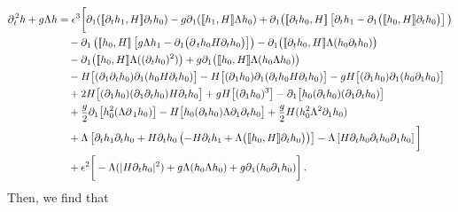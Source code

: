 \documentclass[11pt]{article}
\theoremstyle{plain}
\theoremstyle{definition}
\theoremstyle{definition}
\def\p{\text{\bf\emph{p}}}
\def\p{{\partial\hspace{1pt}}}
\def\comm#1#2{{\llbracket#1,#2\rrbracket}}
\def\smallexp#1{{\text{\small #1}}}
\def\dfrac#1#2{\smallexp{$\displaystyle{}\frac{#1}{#2}$}}
\begin{document}
\begin{align*}
\p_{\!t}^2 h + g\Lambda h &= \epsilon^3\bigg{[}\p_{\!1} (\comm{\p_{\!t} h_1}{H} \partial_t h_0) - g\p_{\!1} (\comm{h_1}{H} \Lambda h_0) + \p_{\!1} \big(\comm{\p_{\!t} h_0}{H} \left[\partial_t h_1-\p_{\!1} \big(\comm{h_0}{H} \partial_t h_0\big)\right]\big) \\
&\quad -\p_{\!1} \left(\comm{h_0}{H} \left[g \Lambda h_1 - \partial_1 \big(\p_t h_0H\partial_t h_0 \big)\right]\right) - \p_{\!1} \big(\comm{\p_{\!t} h_0}{H} \Lambda (h_0 \partial_t h_0)\big) \\
&\quad - \p_{\!1} \big(\comm{h_0}{H} \Lambda ((\p_{\!t} h_0)^2)\big) + g\p_{\!1} \big(\comm{h_0}{H} \Lambda (h_0 \Lambda h_0)\big) \\
&\quad - H \big[(\p_{\!1} \p_{\!t} h_0) \p_{\!1}(h_0 H\p_{\!t} h_0)\big] -  H \big[(\p_{\!1} h_0) \p_{\!1}(\p_{\!t} h_0 H\p_{\!t} h_0)\big]
 - gH \big[(\p_{\!1} h_0) \p_{\!1}(h_0 \partial_1 h_0)\big] \nonumber\\
&\quad + 2 H \big[(\p_{\!1}h_0) (\p_{\!1} \p_{\!t} h_0) H\p_{\!t} h_0\big] + gH \big[(\p_{\!1}h_0)^3\big] - \p_{\!1} \big[h_0 (\p_{\!t} h_0) (\partial_1 \p_{\!t} h_0) \big] \\
&\quad + \dfrac{g}{2} \p_{\!1} \big[h_0^2 (\Lambda \p_{1} h_0)\big] - H \big[h_0 (\p_{\!t} h_0)\Lambda \partial_1\p_{\!t} h_0\big] + \dfrac{g}{2} H (h_0^2 \Lambda^2 \partial_1h_0)\\
&\quad +\Lambda \left[\partial_t h_{1}\partial_t h_{0}  +H\p_{\!t} h_0\left(-H\p_{\!t} h_1 + \Lambda \big(\comm{h_0}{H}  \p_{\!t} h_0\big)\right)\right]- \Lambda \left[ H\p_{\!t} h_0 \partial_t h_{0} \p_{\!1} h_{0} \right]\bigg{]}\\
&\quad + \epsilon^2\bigg{[}-\Lambda (|H \p_{\!t}h_0|^2) + g \Lambda (h_0 \Lambda h_0) + g \p_{\!1} (h_0 \p_{\!1} h_0)\bigg{]}\,.
\end{align*}
Then, we find that
\end{document}
